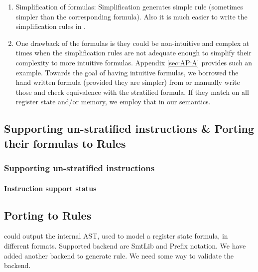 {\begin{enumerate}
\item {Simplification of formulas:} Simplification generates simple \K rule
(sometimes simpler than the corresponding \Strata formula).  Also it is much
easier to write the simplification rules in \K.


\item One drawback of the \Strata formulas is they could be non-intuitive and
complex at times when the simplification rules are not adequate enough to
simplify their complexity to more intuitive formulas. Appendix \ref{sec:AP:A}
provides such an example.  Towards the goal of having intuitive formulas, we
borrowed the hand written formula (provided they are simpler) from \Stoke or
manually write those  and check equivalence with the stratified formula. If they
match on all register state and/or memory, we employ that in our \K semantics.


       


\end{enumerate}

\subsection{Supporting un-stratified instructions \& Porting their formulas to \K Rules}

\subsubsection{Supporting un-stratified instructions}
\paragraph{Instruction support status}



\subsection{Porting to \K Rules}

\Strata could output the internal AST, used to model a register state formula, in different
formats. Supported backend are SmtLib and Prefix notation. We have added another backend 
to generate \K rule. We need some way to validate the backend. 

}
